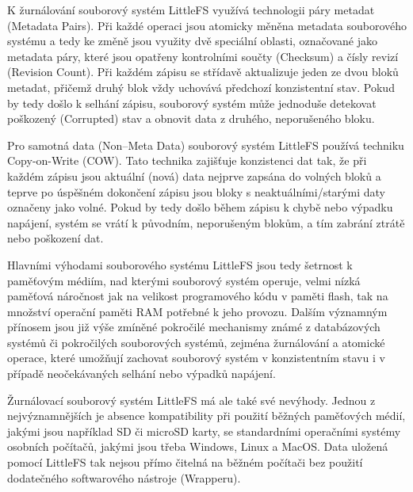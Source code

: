 K žurnálování souborový systém LittleFS využívá technologii páry metadat (Metadata Pairs). Při každé operaci jsou atomicky měněna metadata souborového systému a tedy ke změně jsou využity dvě speciální oblasti, označované jako metadata páry, které jsou opatřeny kontrolními součty (Checksum) a čísly revizí (Revision Count). Při každém zápisu se střídavě aktualizuje jeden ze dvou bloků metadat, přičemž druhý blok vždy uchovává předchozí konzistentní stav. Pokud by tedy došlo k selhání zápisu, souborový systém může jednoduše detekovat poškozený (Corrupted) stav a obnovit data z druhého, neporušeného bloku. \cite{nxp_the_design_of_the_little_filesystem}

Pro samotná data (Non--Meta Data) souborový systém LittleFS používá techniku Copy-on-Write (COW). Tato technika zajišťuje konzistenci dat tak, že při každém zápisu jsou aktuální (nová) data nejprve zapsána do volných bloků a teprve po úspěšném dokončení zápisu jsou bloky s neaktuálními/starými daty označeny jako volné. Pokud by tedy došlo během zápisu k chybě nebo výpadku napájení, systém se vrátí k původním, neporušeným blokům, a tím zabrání ztrátě nebo poškození dat. \cite{nxp_the_design_of_the_little_filesystem}

Hlavními výhodami souborového systému LittleFS jsou tedy šetrnost k paměťovým médiím, nad kterými souborový systém operuje, velmi nízká paměťová náročnost jak na velikost programového kódu v paměti flash, tak na množství operační paměti RAM potřebné k jeho provozu. Dalším významným přínosem jsou již výše zmíněné pokročilé mechanismy známé z databázových systémů či pokročilých souborových systémů, zejména žurnálování a atomické operace, které umožňují zachovat souborový systém v konzistentním stavu i v případě neočekávaných selhání nebo výpadků napájení. \cite{nxp_the_design_of_the_little_filesystem}

Žurnálovací souborový systém LittleFS má ale také své nevýhody. Jednou z nejvýznamnějších je absence kompatibility při použití běžných paměťových médií, jakými jsou například SD či microSD karty, se standardními operačními systémy osobních počítačů, jakými jsou třeba Windows, Linux a MacOS. Data uložená pomocí LittleFS tak nejsou přímo čitelná na běžném počítači bez použití dodatečného softwarového nástroje (Wrapperu). \cite{cnx_software_little_fs}


